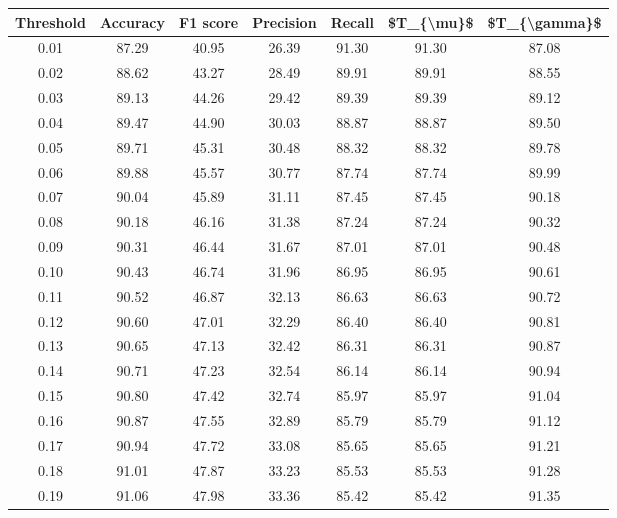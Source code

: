 \begin{tabular}{|c|c|c|c|c|c|c|}
\hline
 Threshold &  Accuracy &  F1 score &  Precision &  Recall &  \$T\_\{\textbackslash mu\}\$ &  \$T\_\{\textbackslash gamma\}\$ \\
\hline
      0.01 &     87.29 &     40.95 &      26.39 &   91.30 &      91.30 &         87.08 \\
      0.02 &     88.62 &     43.27 &      28.49 &   89.91 &      89.91 &         88.55 \\
      0.03 &     89.13 &     44.26 &      29.42 &   89.39 &      89.39 &         89.12 \\
      0.04 &     89.47 &     44.90 &      30.03 &   88.87 &      88.87 &         89.50 \\
      0.05 &     89.71 &     45.31 &      30.48 &   88.32 &      88.32 &         89.78 \\
      0.06 &     89.88 &     45.57 &      30.77 &   87.74 &      87.74 &         89.99 \\
      0.07 &     90.04 &     45.89 &      31.11 &   87.45 &      87.45 &         90.18 \\
      0.08 &     90.18 &     46.16 &      31.38 &   87.24 &      87.24 &         90.32 \\
      0.09 &     90.31 &     46.44 &      31.67 &   87.01 &      87.01 &         90.48 \\
      0.10 &     90.43 &     46.74 &      31.96 &   86.95 &      86.95 &         90.61 \\
      0.11 &     90.52 &     46.87 &      32.13 &   86.63 &      86.63 &         90.72 \\
      0.12 &     90.60 &     47.01 &      32.29 &   86.40 &      86.40 &         90.81 \\
      0.13 &     90.65 &     47.13 &      32.42 &   86.31 &      86.31 &         90.87 \\
      0.14 &     90.71 &     47.23 &      32.54 &   86.14 &      86.14 &         90.94 \\
      0.15 &     90.80 &     47.42 &      32.74 &   85.97 &      85.97 &         91.04 \\
      0.16 &     90.87 &     47.55 &      32.89 &   85.79 &      85.79 &         91.12 \\
      0.17 &     90.94 &     47.72 &      33.08 &   85.65 &      85.65 &         91.21 \\
      0.18 &     91.01 &     47.87 &      33.23 &   85.53 &      85.53 &         91.28 \\
      0.19 &     91.06 &     47.98 &      33.36 &   85.42 &      85.42 &         91.35 \\

\end{tabular}
